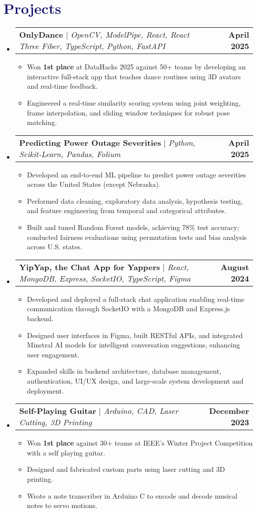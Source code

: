 \documentclass[letterpaper,11pt]{article}
\makeatletter
\newcommand{\resumeItem}[1]{
  \item\small{
    {#1 \vspace{-2pt}}
  }
}
\newcommand{\resumeProjectHeading}[2]{
    \item
    \begin{tabular*}{1.001\textwidth}{l@{\extracolsep{\fill}}r}
      \small#1 & \textbf{\small #2}\\
    \end{tabular*}\vspace{-7pt}
}
\newcommand{\resumeSubHeadingListStart}{\begin{itemize}[leftmargin=0.0in, label={}]}
\newcommand{\resumeSubHeadingListEnd}{\end{itemize}}
\newcommand{\resumeItemListStart}{\begin{itemize}}
\newcommand{\resumeItemListEnd}{\end{itemize}\vspace{-5pt}}
\newcommand\accentColor{MidnightBlue}
\makeatother
\begin{document}
\section{\textcolor{\accentColor}{Projects}}
\resumeSubHeadingListStart
\resumeProjectHeading
    {\textbf{OnlyDance} $|$ \emph{OpenCV, ModelPipe, React, React Three Fiber, TypeScript, Python, FastAPI}}{April 2025}
    \resumeItemListStart
        \resumeItem{Won \textbf{1st place} at DataHacks 2025 against 50+ teams by developing an interactive full-stack app that teaches dance routines using 3D avatars and real-time feedback.}
        \resumeItem{Engineered a real-time similarity scoring system using joint weighting, frame interpolation, and sliding window techniques for robust pose matching.}
    \resumeItemListEnd
\vspace{-15pt}
\resumeProjectHeading
    {\textbf{Predicting Power Outage Severities} $|$ \emph{Python, Scikit-Learn, Pandas, Folium}}{April 2025}
    \resumeItemListStart
        \resumeItem{Developed an end-to-end ML pipeline to predict power outage severities across the United States (except Nebraska).}
        \resumeItem{Performed data cleaning, exploratory data analysis, hypothesis testing, and feature engineering from temporal and categorical attributes.}
        \resumeItem{Built and tuned Random Forest models, achieving 78\% test accuracy; conducted fairness evaluations using permutation tests and bias analysis across U.S. states.}
    \resumeItemListEnd
\vspace{-15pt}
\resumeProjectHeading
    {\textbf{YipYap, the Chat App for Yappers} $|$ \emph{React, MongoDB, Express, SocketIO, TypeScript, Figma}}{August 2024}
    \resumeItemListStart
        \resumeItem{Developed and deployed a full-stack chat application enabling real-time communication through SocketIO with a MongoDB and Express.js backend.}
        \resumeItem{Designed user interfaces in Figma, built RESTful APIs, and integrated Minstral AI models for intelligent conversation suggestions, enhancing user engagement.}
        \resumeItem{Expanded skills in backend architecture, database management, authentication, UI/UX design, and large-scale system development and deployment.}
    \resumeItemListEnd
\vspace{-15pt}
\resumeProjectHeading
    {\textbf{Self-Playing Guitar} $|$ \emph{Arduino, CAD, Laser Cutting, 3D Printing}}{December 2023}
    \resumeItemListStart
        \resumeItem{Won \textbf{1st place} against 30+ teams at IEEE's Winter Project Competition with a self playing guitar.}
        \resumeItem{Designed and fabricated custom parts using laser cutting and 3D printing.}
        \resumeItem{Wrote a note transcriber in Arduino C to encode and decode musical notes to servo motions.}
    \resumeItemListEnd
\resumeSubHeadingListEnd
\vspace{-15pt}
\end{document}
